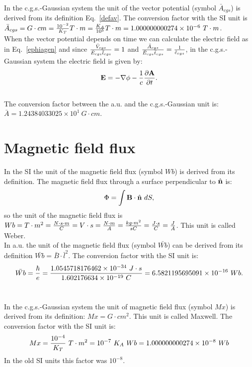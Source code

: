 \documentclass[12pt,a4paper]{article}
\def\hbarf{1.0545718176462\times 10^{-34}}
\def\e{1.602176634\times 10^{-19}}
\def\barwb{6.5821195695091\times 10^{-16}}
\def\avtoav{1.000000000274\times 10^{-6}}
\def\wbtowb{1.000000000274\times 10^{-8}}
\def\baravcgs{1.24384033025\times 10^{1}}
\begin{document}
{\color{orange} In the c.g.s.-Gaussian system the unit of the vector 
potential (symbol $\bar A_{cgs}$) is derived from its definition 
Eq.~\ref{defav}.
The conversion factor with the SI unit is 
$\bar A_{cgs} = G \cdot cm = {10^{-2}\over K_T} T\cdot m=
{K_A \over 10^5} T\cdot m=\avtoav\ T\cdot m$. \\

When the vector potential depends on time we can calculate the electric
field as in Eq.~\ref{ephiagen} and since 
${\bar V_{cgs} \over \bar E_{cgs} \bar l_{cgs}}=1$
and ${\bar A_{cgs} \over \bar E_{cgs} \bar t_{cgs}}={1\over 
\tilde c_{cgs}}$, in the 
c.g.s.-Gaussian system the electric field is given by:
\begin{equation}
{\bf E}=-\nabla \phi -
{1 \over c} {\partial {\bf A} \over \partial t}.
\end{equation}
}
\\

{\color{green}
The conversion factor between the a.u. and the c.g.s.-Gaussian unit is:
$\bar A = \baravcgs\ G\cdot cm$.
}

\newpage
\section{\color{coral}Magnetic field flux}
In the SI the unit of the magnetic field flux (symbol $Wb$)
is derived from its definition. The  
magnetic field flux through a surface perpendicular to 
$\hat {\bf n}$ is:
\begin{equation}
\Phi=\int {\bf B}\cdot \hat {\bf n}\ dS,
\end{equation}
so the unit of the magnetic field flux is $Wb= T \cdot m^2={N \cdot s\cdot m
\over C}=V\cdot s={N\cdot m\over A}={kg\cdot m^2 \over s C}=
{J\cdot s\over C}={J\over A}$. This
unit is called Weber.
\\

{\color{web-blue} In a.u. the unit of the magnetic field flux
(symbol $\bar {Wb}$) can be derived from its definition
$\bar {Wb}=\bar B \cdot \bar l^2$. The conversion
factor with the SI unit is:
\begin{equation}
\bar {Wb} = {\hbar \over e}=
{\hbarf\ J\cdot s\over \e\ C}=\barwb\ Wb.
\end{equation}
\\
}

{\color{orange} In the c.g.s.-Gaussian system the unit of magnetic field
flux (symbol $Mx$) is derived from its definition: $Mx=G\cdot cm^2$.
This unit is called Maxwell.
The conversion factor with the SI unit is:
\begin{equation}
Mx = {10^{-4}\over K_T}\ T\cdot m^2 = 10^{-7}\ K_A\ Wb =\wbtowb\ Wb
\end{equation}
In the old SI units this factor was $10^{-8}$.
}
\\
\end{document}
